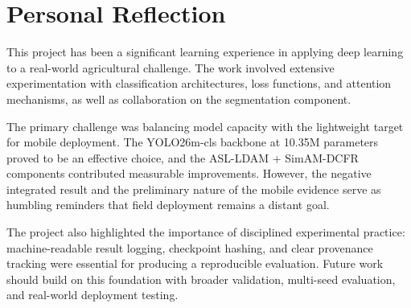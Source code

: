 
\section{Personal Reflection}
\label{sec:reflection}

This project has been a significant learning experience in applying deep learning to a real-world agricultural challenge. The work involved extensive experimentation with classification architectures, loss functions, and attention mechanisms, as well as collaboration on the segmentation component.

The primary challenge was balancing model capacity with the lightweight target for mobile deployment. The YOLO26m-cls backbone at 10.35M parameters proved to be an effective choice, and the ASL-LDAM + SimAM-DCFR components contributed measurable improvements. However, the negative integrated result and the preliminary nature of the mobile evidence serve as humbling reminders that field deployment remains a distant goal.

The project also highlighted the importance of disciplined experimental practice: machine-readable result logging, checkpoint hashing, and clear provenance tracking were essential for producing a reproducible evaluation. Future work should build on this foundation with broader validation, multi-seed evaluation, and real-world deployment testing.